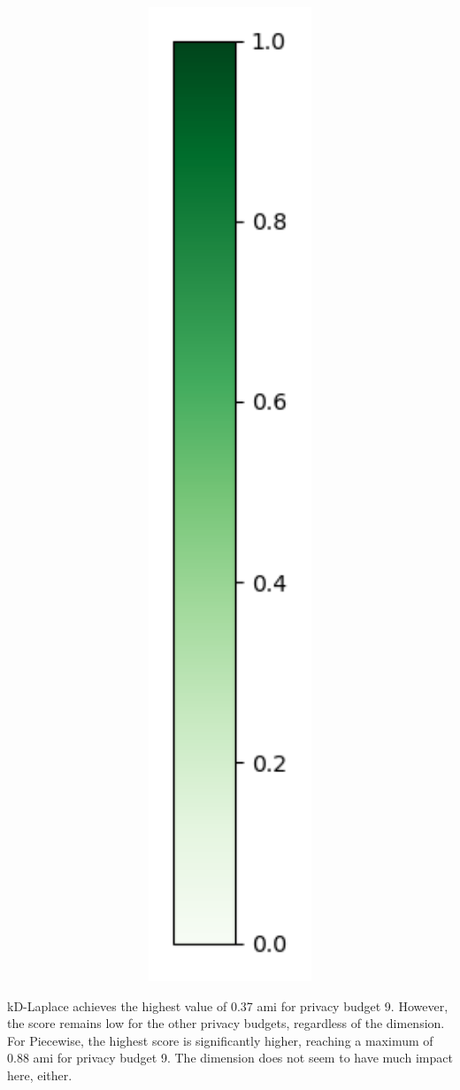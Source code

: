 \begin{figure}[H]
\begin{subfigure}[b]{0.075\textwidth}
    \includegraphics[width=1\textwidth]{Results/kd-laplace/kd-Laplace/seeds-dataset/heatmap_legend.png}
  \end{subfigure}
\end{figure}
kD-Laplace achieves the highest value of 0.37 \gls{ami} for privacy budget 9. However, the score remains low for the other privacy budgets, regardless of the dimension.
For Piecewise, the highest score is significantly higher, reaching a maximum of 0.88 \gls{ami} for privacy budget 9. The dimension does not seem to have much impact here, either.
\newpage
